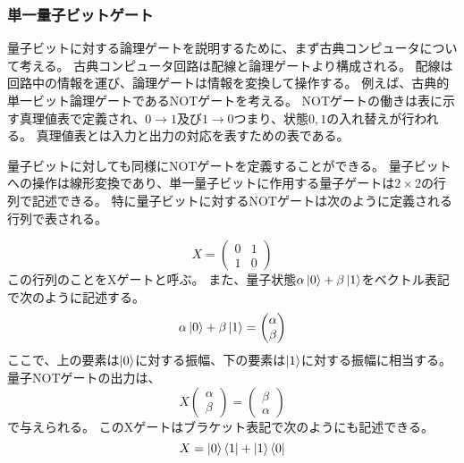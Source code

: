 \begin{comment}
    量子計算についての記述
\end{comment}

\subsubsection{単一量子ビットゲート}
量子ビットに対する論理ゲートを説明するために、まず古典コンピュータについて考える。
古典コンピュータ回路は配線と論理ゲートより構成される。
配線は回路中の情報を運び、論理ゲートは情報を変換して操作する。
例えば、古典的単一ビット論理ゲートであるNOTゲートを考える。 
NOTゲートの働きは表に示す真理値表で定義され、$0 \rightarrow 1$及び$1 \rightarrow 0$つまり、状態$0, 1$の入れ替えが行われる。
真理値表とは入力と出力の対応を表すための表である。

量子ビットに対しても同様にNOTゲートを定義することができる。
量子ビットへの操作は線形変換であり、単一量子ビットに作用する量子ゲートは$2 \times 2$の行列で記述できる。
特に量子ビットに対するNOTゲートは次のように定義される行列で表される。

\begin{equation}
    X = \begin{pmatrix}
        0 & 1\\
        1 & 0
    \end{pmatrix}
\end{equation}
この行列のことをXゲートと呼ぶ。
また、量子状態$\alpha \ket{0} + \beta \ket{1}$をベクトル表記で次のように記述する。
\begin{equation}
    \alpha \ket{0} + \beta \ket{1} = \begin{pmatrix}
        \alpha \\
        \beta
    \end{pmatrix}
\end{equation}
ここで、上の要素は$\ket{0}$に対する振幅、下の要素は$\ket{1}$に対する振幅に相当する。
量子NOTゲートの出力は、
\begin{equation}
    X \begin{pmatrix}
        \alpha \\
        \beta
    \end{pmatrix}
    = \begin{pmatrix}
        \beta \\
        \alpha
    \end{pmatrix}
\end{equation}
で与えられる。
このXゲートはブラケット表記で次のようにも記述できる。
\begin{equation}
    X = \ket{0}\bra{1} + \ket{1}\bra{0}
\end{equation}

